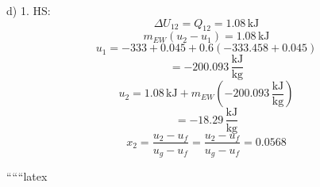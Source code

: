 d) 
1. HS: 
\[
\Delta U_{12} = Q_{12} = 1.08 \, \text{kJ}
\]
\[
m_{EW} (u_2 - u_1) = 1.08 \, \text{kJ}
\]
\[
u_1 = -333 + 0.045 + 0.6 (-333.458 + 0.045)
\]
\[
= -200.093 \, \frac{\text{kJ}}{\text{kg}}
\]
\[
u_2 = 1.08 \, \text{kJ} + m_{EW} (-200.093 \, \frac{\text{kJ}}{\text{kg}})
\]
\[
= -18.29 \, \frac{\text{kJ}}{\text{kg}}
\]
\[
x_2 = \frac{u_2 - u_f}{u_g - u_f} = \frac{u_2 - u_f}{u_g - u_f} = 0.0568
\]

``````latex
